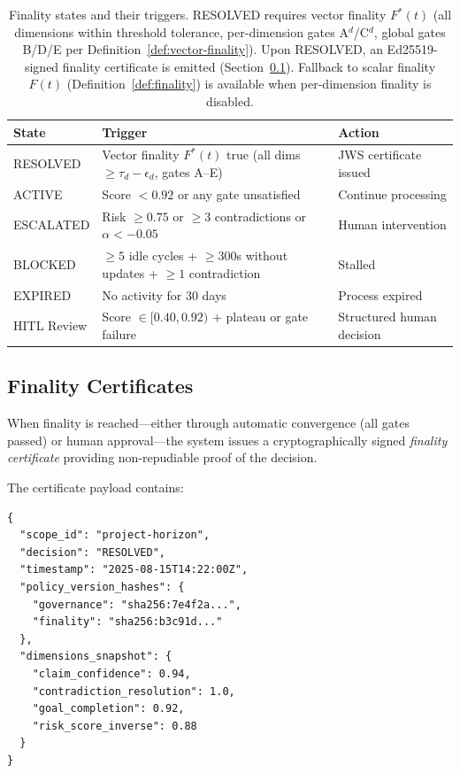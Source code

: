 \documentclass[11pt]{article}
\begin{document}
\begin{table}[H]
\centering
\small
\begin{tabular}{lp{7cm}l}
\toprule
\textbf{State} & \textbf{Trigger} & \textbf{Action} \\
\midrule
RESOLVED & Vector finality $F^*(t)$ true (all dims $\geq \tau_d - \epsilon_d$, gates A--E) & JWS certificate issued \\
ACTIVE & Score $< 0.92$ or any gate unsatisfied & Continue processing \\
ESCALATED & Risk $\geq 0.75$ or $\geq 3$ contradictions or $\alpha < -0.05$ & Human intervention \\
BLOCKED & $\geq 5$ idle cycles + $\geq 300$s without updates + $\geq 1$ contradiction & Stalled \\
EXPIRED & No activity for 30 days & Process expired \\
HITL Review & Score $\in [0.40, 0.92)$ + plateau or gate failure & Structured human decision \\
\bottomrule
\end{tabular}
\caption{Finality states and their triggers. RESOLVED requires vector finality $F^*(t)$ (all dimensions
within threshold tolerance, per-dimension gates A$^d$/C$^d$, global gates B/D/E per Definition~\ref{def:vector-finality}).
Upon RESOLVED, an Ed25519-signed finality certificate is emitted (Section~\ref{sec:certificates}).
Fallback to scalar finality $F(t)$ (Definition~\ref{def:finality}) is available when per-dimension finality is disabled.}
\label{tab:finality}
\end{table}

\subsection{Finality Certificates}
\label{sec:certificates}

When finality is reached---either through automatic convergence (all gates passed) or human approval---the system issues a cryptographically signed \emph{finality certificate} providing non-repudiable proof of the decision.

The certificate payload contains:

\begin{lstlisting}
{
  "scope_id": "project-horizon",
  "decision": "RESOLVED",
  "timestamp": "2025-08-15T14:22:00Z",
  "policy_version_hashes": {
    "governance": "sha256:7e4f2a...",
    "finality": "sha256:b3c91d..."
  },
  "dimensions_snapshot": {
    "claim_confidence": 0.94,
    "contradiction_resolution": 1.0,
    "goal_completion": 0.92,
    "risk_score_inverse": 0.88
  }
}
\end{lstlisting}
\end{document}
